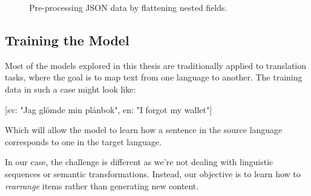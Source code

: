 \documentclass[12pt,a4paper]{report}
\begin{document}
\begin{figure}[ht]
    \centering
    \vspace{0.5cm}


    \vspace{0.5cm}
    \caption{Pre-processing JSON data by flattening nested fields.}
    \label{fig:flatten}
\end{figure}

\subsection{Training the Model}
Most of the models explored in this thesis are traditionally applied to translation tasks, where the goal is to map text from one language to another. The training data in such a case might look like:

\vspace{0.5cm}

[sv: "Jag glömde min plånbok", en: "I forgot my wallet"]

\vspace{0.5cm}

Which will allow the model to learn how a sentence in the source language corresponds to one in the target language. 

In our case, the challenge is different as we're not dealing with linguistic sequences or semantic transformations. Instead, our objective is to learn how to \textit{rearrange} items rather than generating new content. 
\end{document}
